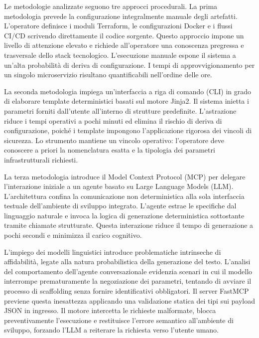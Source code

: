 Le metodologie analizzate seguono tre approcci procedurali. La prima metodologia prevede la configurazione integralmente manuale degli artefatti. L'operatore definisce i moduli Terraform, le configurazioni Docker e i flussi CI/CD scrivendo direttamente il codice sorgente. Questo approccio impone un livello di attenzione elevato e richiede all'operatore una conoscenza pregressa e trasversale dello stack tecnologico. L'esecuzione manuale espone il sistema a un'alta probabilità di deriva di configurazione. I tempi di approvvigionamento per un singolo microservizio risultano quantificabili nell'ordine delle ore.

La seconda metodologia impiega un'interfaccia a riga di comando (CLI) in grado di elaborare template deterministici basati sul motore Jinja2. Il sistema inietta i parametri forniti dall'utente all'interno di strutture predefinite. L'astrazione riduce i tempi operativi a pochi minuti ed elimina il rischio di deriva di configurazione, poiché i template impongono l'applicazione rigorosa dei vincoli di sicurezza. Lo strumento mantiene un vincolo operativo: l'operatore deve conoscere a priori la nomenclatura esatta e la tipologia dei parametri infrastrutturali richiesti.

La terza metodologia introduce il Model Context Protocol (MCP) per delegare l'interazione iniziale a un agente basato su Large Language Models (LLM). L'architettura confina la comunicazione non deterministica alla sola interfaccia testuale dell'ambiente di sviluppo integrato. L'agente estrae le specifiche dal linguaggio naturale e invoca la logica di generazione deterministica sottostante tramite chiamate strutturate. Questa interazione riduce il tempo di generazione a pochi secondi e minimizza il carico cognitivo.

L'impiego dei modelli linguistici introduce problematiche intrinseche di affidabilità, legate alla natura probabilistica della generazione del testo. L'analisi del comportamento dell'agente conversazionale evidenzia scenari in cui il modello interrompe prematuramente la negoziazione dei parametri, tentando di avviare il processo di scaffolding senza fornire identificativi obbligatori. Il server FastMCP previene questa inesattezza applicando una validazione statica dei tipi sui payload JSON in ingresso. Il motore intercetta le richieste malformate, blocca preventivamente l'esecuzione e restituisce l'errore semantico all'ambiente di sviluppo, forzando l'LLM a reiterare la richiesta verso l'utente umano.